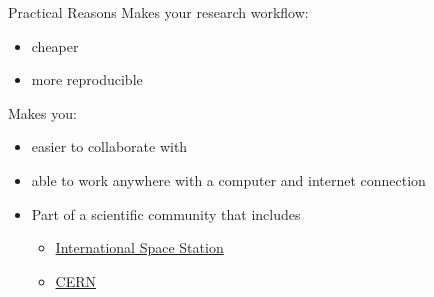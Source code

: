 \documentclass[xcolor=dvipsnames]{beamer}
\begin{document}
\begin{frame}

\begin{block}{Practical Reasons}
Makes your research workflow:
\begin{itemize}
\item cheaper
\item more reproducible 
\newline
\end{itemize}

Makes you:
\begin{itemize}
\item easier to collaborate with 
\item able to work anywhere with a computer and internet connection
\item Part of a scientific community that includes \begin{itemize}
      \item \href{https://training.linuxfoundation.org/why-our-linux-training/training-reviews/linux-foundation-training-prepares-the-international-space-station-for-linux-migration}{International Space Station} 
      \item \href{https://linux.web.cern.ch/linux/scientific.shtml}{CERN}
\end{itemize}
\end{itemize}

\end{block}

\end{frame}
\end{document}
